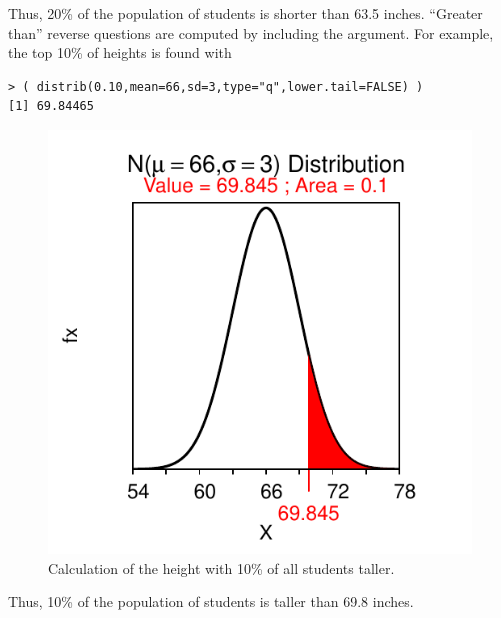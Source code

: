 \documentclass[10pt,openany]{book}\usepackage[]{graphicx}\usepackage[]{color}
\makeatletter
\newenvironment{kframe}{%
 \def\at@end@of@kframe{}%
 \ifinner\ifhmode%
  \def\at@end@of@kframe{\end{minipage}}%
  \begin{minipage}{\columnwidth}%
 \fi\fi%
 \def\FrameCommand##1{\hskip\@totalleftmargin \hskip-\fboxsep
 \colorbox{shadecolor}{##1}\hskip-\fboxsep
     \hskip-\linewidth \hskip-\@totalleftmargin \hskip\columnwidth}%
 \MakeFramed {\advance\hsize-\width
   \@totalleftmargin\z@ \linewidth\hsize
   \@setminipage}}%
 {\par\unskip\endMakeFramed%
 \at@end@of@kframe}
\newenvironment{knitrout}{}{} %
\makeatother
\begin{document}
Thus, 20\% of the population of students is shorter than 63.5 inches.  ``Greater than'' reverse questions are computed by including the  argument.  For example, the top 10\% of heights  is found with
\begin{knitrout}
\color{fgcolor}\begin{kframe}
\begin{verbatim}
> ( distrib(0.10,mean=66,sd=3,type="q",lower.tail=FALSE) )
[1] 69.84465
\end{verbatim}
\end{kframe}\begin{figure}[hbtp]

{\centering \includegraphics[width=.4\linewidth]{Figs/NormZCalc5-1} 

}

\caption[Calculation of the height with 10\% of all students taller]{Calculation of the height with 10\% of all students taller.}\label{fig:NormZCalc5}
\end{figure}


\end{knitrout}

Thus, 10\% of the population of students is taller than 69.8 inches.
\end{document}
